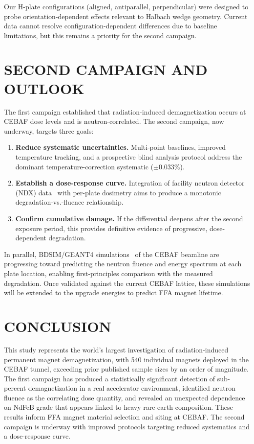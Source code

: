 \documentclass[a4paper,
               ]{jacow}
\begin{document}
Our H-plate configurations (aligned, antiparallel, perpendicular) were designed to probe orientation-dependent effects relevant to Halbach wedge geometry. Current data cannot resolve configuration-dependent differences due to baseline limitations, but this remains a priority for the second campaign.

\section{SECOND CAMPAIGN AND OUTLOOK}

The first campaign established that radiation-induced demagnetization occurs at CEBAF dose levels and is neutron-correlated. The second campaign, now underway, targets three goals:

\begin{enumerate}
\item \textbf{Reduce systematic uncertainties.} Multi-point baselines, improved temperature tracking, and a prospective blind analysis protocol address the dominant temperature-correction systematic (${\pm}0.033\%$).
\item \textbf{Establish a dose-response curve.} Integration of facility neutron detector (NDX) data~\cite{NDX} with per-plate dosimetry aims to produce a monotonic degradation-vs.-fluence relationship.
\item \textbf{Confirm cumulative damage.} If the differential deepens after the second exposure period, this provides definitive evidence of progressive, dose-dependent degradation.
\end{enumerate}

In parallel, BDSIM/GEANT4 simulations~\cite{NEVAY:BDSIM, GEANT4, Gamage:IPAC24-THPS57, Gamage:NAPAC25-WEP074} of the CEBAF beamline are progressing toward predicting the neutron fluence and energy spectrum at each plate location, enabling first-principles comparison with the measured degradation. Once validated against the current CEBAF lattice, these simulations will be extended to the upgrade energies to predict FFA magnet lifetime.

\section{CONCLUSION}

This study represents the world's largest investigation of radiation-induced permanent magnet demagnetization, with 540 individual magnets deployed in the CEBAF tunnel, exceeding prior published sample sizes by an order of magnitude. The first campaign has produced a statistically significant detection of sub-percent demagnetization in a real accelerator environment, identified neutron fluence as the correlating dose quantity, and revealed an unexpected dependence on NdFeB grade that appears linked to heavy rare-earth composition. These results inform FFA magnet material selection and siting at CEBAF. The second campaign is underway with improved protocols targeting reduced systematics and a dose-response curve.
\end{document}
